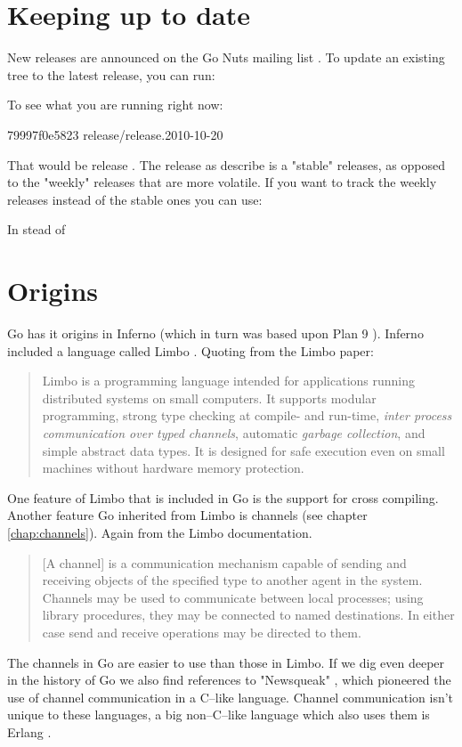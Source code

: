 \section{Keeping up to date}
New releases are announced on the Go Nuts mailing list \cite{go_nuts}. To update an
existing tree to the latest release, you can run:
\begin{display}
\pr {}
\pr {}
\pr {}
\pr {}
\pr {}
\end{display}
\noindent{}To see what you are running right now:
\begin{display}
\pr {}
\pr {}
79997f0e5823 release/release.2010-10-20
\end{display}
\noindent{}That would be release . The release as 
describe is a "stable" releases,
as opposed to the "weekly" releases that are more volatile. 
If you want to track the weekly releases
instead of the stable ones you can use:
\begin{display}
\pr {}
\end{display}
In stead of
\begin{display}
\pr {}
\end{display}

\section{Origins}
Go has it origins in Inferno \cite{inferno} (which in turn was based
upon Plan 9 \cite{plan9}). Inferno included a language called Limbo
\cite{limbo}. Quoting from the Limbo paper:
\begin{quote}
Limbo is a programming language intended for applications running
distributed systems on small computers. It supports modular programming,
strong type checking at compile- and run-time, \emph{inter process
communication over typed channels}, automatic \emph{garbage collection}, and
simple abstract data types. It is designed for safe execution even on
small machines without hardware memory protection.
\end{quote}
One feature of Limbo that is
included in Go is the support for cross compiling.
Another feature Go inherited from Limbo is channels (see chapter
\ref{chap:channels}). Again from the Limbo documentation.
\begin{quote}
[A channel] is a communication mechanism capable of sending and receiving objects of
the specified type to another agent in the system. Channels may be used
to communicate between local processes; using library procedures, they
may be connected to named destinations. In either case send and receive
operations may be directed to them.
\end{quote}
The channels in Go are easier to use than those in Limbo.
If we dig even deeper in the history of Go we also find references
to "Newsqueak" \cite{newsqueak}, which pioneered the use of 
channel communication in a C--like language. Channel
communication isn't unique to these languages, a big non--C--like
language which also uses them is Erlang \cite{erlang}.

